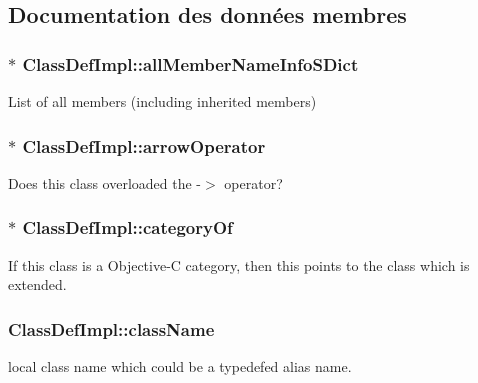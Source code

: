 \subsection{Documentation des données membres}
\hypertarget{class_class_def_impl_ae645a7a6aceae390224919d15d6df80b}{}
\subsubsection[{all\+Member\+Name\+Info\+S\+Dict}]{$\ast$ Class\+Def\+Impl\+::all\+Member\+Name\+Info\+S\+Dict}\label{class_class_def_impl_ae645a7a6aceae390224919d15d6df80b}
List of all members (including inherited members) \hypertarget{class_class_def_impl_a94bc1b4ff18537f707b575ce6e60920c}{}
\subsubsection[{arrow\+Operator}]{$\ast$ Class\+Def\+Impl\+::arrow\+Operator}\label{class_class_def_impl_a94bc1b4ff18537f707b575ce6e60920c}
Does this class overloaded the -\/$>$ operator? \hypertarget{class_class_def_impl_aa33f23ac88249219ec76053a54684ae8}{}
\subsubsection[{category\+Of}]{$\ast$ Class\+Def\+Impl\+::category\+Of}\label{class_class_def_impl_aa33f23ac88249219ec76053a54684ae8}
If this class is a Objective-\/\+C category, then this points to the class which is extended. \hypertarget{class_class_def_impl_a5eecc11f35a74b7ac718fc46b9d8de26}{}
\subsubsection[{class\+Name}]{ Class\+Def\+Impl\+::class\+Name}\label{class_class_def_impl_a5eecc11f35a74b7ac718fc46b9d8de26}
local class name which could be a typedef\textquotesingle{}ed alias name. \hypertarget{class_class_def_impl_af8b4e7fb963b0feff4a8009a358bd90b}{}
